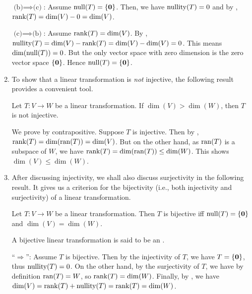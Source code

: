 \begin{enumerate}
\begin{pf}
\underline{\(\text{(b)}\implies \text{(c)}\)}: Assume \(\operatorname{null}(T)=\{\vb*{0}\}\).
Then, we have \(\operatorname{nullity}(T)=0\) and by ,
\(\operatorname{rank}(T)=\dim(V)-0=\dim(V)\).

\underline{\(\text{(c)}\implies \text{(b)}\)}: Assume \(\operatorname{rank}(T)=\dim(V)\). By
, \(\operatorname{nullity}(T)=\dim(V)-\operatorname{rank}(T)=\dim(V)-\dim(V)=0\). This means
\(\dim(\operatorname{null}(T))=0\). But the only vector space with zero dimension is the zero
vector space \(\{\vb*{0}\}\). Hence \(\operatorname{null}(T)=\{\vb*{0}\}\).
\end{pf}
\item To show that a linear transformation is \emph{not} injective, the
following result provides a convenient tool.

\begin{proposition}
\label{prp:suff-not-inj}
Let \(T:V\to W\) be a linear transformation. If \(\dim(V)>\dim(W)\), then \(T\)
is not injective.
\end{proposition}
\begin{pf}
We prove by contrapositive. Suppose \(T\) is injective. Then by
, \(\operatorname{rank}(T)=\dim(\operatorname{ran}(T))=\dim(V)\). But on the
other hand, as \(\operatorname{ran}(T)\) is a subspace of \(W\), we have
\(\operatorname{rank}(T)=\dim(\operatorname{ran}(T))\le\dim(W)\). This shows \(\dim(V)\le\dim(W)\).
\end{pf}

\item After discussing injectivity, we shall also discuss surjectivity in the
following result. It gives us a criterion for the bijectivity (i.e., both
injectivity and surjectivity) of a linear transformation.

\begin{theorem}
\label{thm:lin-tran-bij-crit}
Let \(T:V\to W\) be a linear transformation. Then \(T\) is bijective iff
\(\operatorname{null}(T)=\{\vb*{0}\}\) and \(\dim(V)=\dim(W)\).
\end{theorem}
\begin{note}
A bijective linear transformation is said to be an .
\end{note}

\begin{pf}
``\(\Rightarrow\)'': Assume \(T\) is bijective. Then by the injectivity of
\(T\), we have \(\null{T}=\{\vect{0}\}\), thus \(\operatorname{nullity}(T)=0\). On the other
hand, by the surjectivity of \(T\), we have by definition \(\operatorname{ran}(T)=W\), so
\(\operatorname{rank}(T)=\dim(W)\). Finally, by , we have
\(\dim(V)=\operatorname{rank}(T)+\operatorname{nullity}(T)=\operatorname{rank}(T)=\dim(W)\).



\end{pf}
\end{enumerate}
